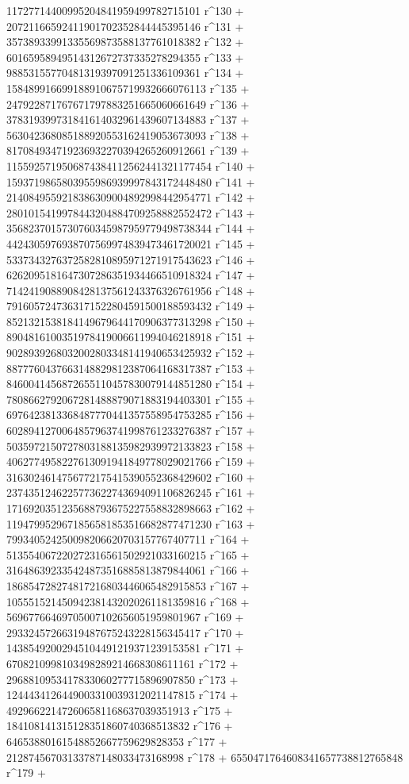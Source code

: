        11727714400995204841959499782715101 r^130 + 
       20721166592411901702352844445395146 r^131 + 
       35738933991335569873588137761018382 r^132 + 
       60165958949514312672737335278294355 r^133 + 
       98853155770481319397091251336109361 r^134 + 
       158489916699188910675719932666076113 r^135 + 
       247922871767671797883251665060661649 r^136 + 
       378319399731841614032961439607134883 r^137 + 
       563042368085188920553162419053673093 r^138 + 
       817084934719236932270394265260912661 r^139 + 
       1155925719506874384112562441321177454 r^140 + 
       1593719865803955986939997843172448480 r^141 + 
       2140849559218386309004892998442954771 r^142 + 
       2801015419978443204884709258882552472 r^143 + 
       3568237015730760345987959779498738344 r^144 + 
       4424305976938707569974839473461720021 r^145 + 
       5337343276372582810895971271917543623 r^146 + 
       6262095181647307286351934466510918324 r^147 + 
       7142419088908428137561243376326761956 r^148 + 
       7916057247363171522804591500188593432 r^149 + 
       8521321538184149679644170906377313298 r^150 + 
       8904816100351978419006611994046218918 r^151 + 
       9028939268032002803348141940653425932 r^152 + 
       8877760437663148829812387064168317387 r^153 + 
       8460041456872655110457830079144851280 r^154 + 
       7808662792067281488879071883194403301 r^155 + 
       6976423813368487770441357558954753285 r^156 + 
       6028941270064857963741998761233276387 r^157 + 
       5035972150727803188135982939972133823 r^158 + 
       4062774958227613091941849778029021766 r^159 + 
       3163024614756772175415390552368429602 r^160 + 
       2374351246225773622743694091106826245 r^161 + 
       1716920351235688793675227558832898663 r^162 + 
       1194799529671856581853516682877471230 r^163 + 
       799340524250098206620703157767407711 r^164 + 
       513554067220272316561502921033160215 r^165 + 
       316486392335424873516885813879844061 r^166 + 
       186854728274817216803446065482915853 r^167 + 
       105551521450942381432020261181359816 r^168 + 
       56967766469705007102656051959801967 r^169 + 
       29332457266319487675243228156345417 r^170 + 
       14385492002945104491219371239153581 r^171 + 
       6708210998103498289214668308611161 r^172 + 
       2968810953417833060277715896907850 r^173 + 
       1244434126449003310039312021147815 r^174 + 
       492966221472606581168637039351913 r^175 + 
       184108141315128351860740368513832 r^176 + 
       64653880161548852667759629828353 r^177 + 
       21287456703133787148033473168998 r^178 + 
       6550471764608341657738812765848 r^179 + 
